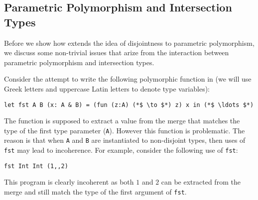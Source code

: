 \subsection{Parametric Polymorphism and Intersection Types}\label{subsec:polymorphism}
Before we show how \namedis extends the idea of disjointness to parametric
polymorphism, we discuss some non-trivial issues that arize from
the interaction between parametric polymorphism and intersection types.
\begin{comment}
Dunfield~\cite{} provides a
good illustrative example of the issues that arise when combining
disjoint intersection types and parametric polymorphism:
\[\lambda x. {\bf let}~y = 0 \mergeop x~{\bf in}~x\]
\end{comment}
Consider the attempt to write
the following polymorphic function in \namedis (we will use Greek letters and
uppercase Latin letters to denote type variables):
\begin{lstlisting}
let fst A B (x: A & B) = (fun (z:A) (*$ \to $*) z) x in (*$ \ldots $*)
\end{lstlisting}
The
 function is supposed to extract a value from the merge that
matches the type of the first type parameter (\lstinline{A}).  However
this function is problematic.  The reason is that when
\lstinline{A} and \lstinline{B} are instantiated to non-disjoint
types, then uses of \lstinline{fst} may lead to incoherence.
For example, consider the following use of \lstinline{fst}:
\begin{lstlisting}
fst Int Int (1,,2)
\end{lstlisting}
\noindent This program is clearly incoherent as both
$1$ and $2$ can be extracted from the merge and still match the type
of the first argument of \lstinline{fst}.

